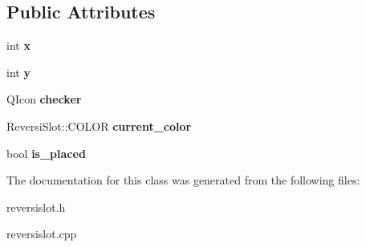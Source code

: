 \subsection*{Public Attributes}
\begin{DoxyCompactItemize}
\item 
\mbox{\label{classReversiSlot_a25bc826b1690c763e695f3817cc40068}} 
int {\bfseries x}
\item 
\mbox{\label{classReversiSlot_a5d446f8044adf9aeffc665b341a7ab21}} 
int {\bfseries y}
\item 
\mbox{\label{classReversiSlot_aafe297511fff8ba594481477f9f80d6e}} 
Q\+Icon {\bfseries checker}
\item 
\mbox{\label{classReversiSlot_a5f0da16f014d9af688bd6658d7b89836}} 
Reversi\+Slot\+::\+C\+O\+L\+OR {\bfseries current\+\_\+color}
\item 
\mbox{\label{classReversiSlot_a8ef75203a905d987eccef61999e9ae6a}} 
bool {\bfseries is\+\_\+placed}
\end{DoxyCompactItemize}


The documentation for this class was generated from the following files\+:\begin{DoxyCompactItemize}
\item 
reversislot.\+h\item 
reversislot.\+cpp\end{DoxyCompactItemize}
